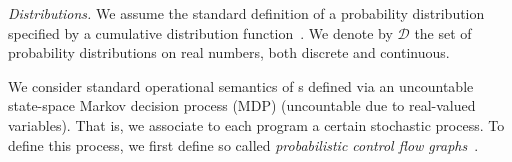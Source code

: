 \emph{Distributions.} We assume the standard definition of a probability 
distribution specified by a cumulative distribution 
function~\cite{Billingsley:book}. We denote by $\mathcal{D}$ the set of 
probability distributions on 
real numbers, both discrete and continuous.

\smallskip{}
We consider standard operational semantics of \PP{}s defined via an 
uncountable state-space
Markov decision process (MDP) (uncountable due to real-valued variables).
That is, we associate to each program 
a certain stochastic process.
To define this process, we first define so called 
\emph{probabilistic control flow graphs}~\cite{CFG16}.

